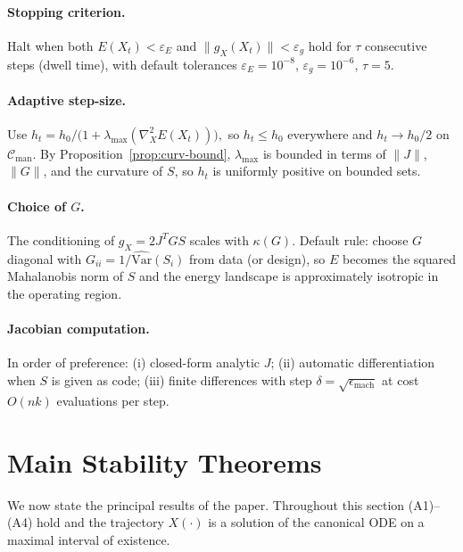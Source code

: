 \documentclass[11pt,oneside]{amsart}
\theoremstyle{plain}
\theoremstyle{definition}
\newcommand{\gX}{g_X}
\newcommand{\Cman}{\mathcal{C}_{\mathrm{man}}}
\begin{document}
\paragraph{Stopping criterion.} Halt when both
\(
  E(X_{t}) < \varepsilon_{E}
\)
and
\(
  \|\gX(X_{t})\| < \varepsilon_{g}
\)
hold for $\tau$ consecutive steps (dwell time), with default tolerances
$\varepsilon_{E} = 10^{-8}$, $\varepsilon_{g} = 10^{-6}$, $\tau = 5$.

\paragraph{Adaptive step-size.} Use
\(
  h_{t} = h_{0} / \bigl(1 + \lambda_{\max}(\nabla^{2}_{X}E(X_{t}))\bigr),
\)
so $h_{t}\le h_{0}$ everywhere and $h_{t}\to h_{0}/2$ on $\Cman$.
By Proposition~\ref{prop:curv-bound}, $\lambda_{\max}$ is bounded in
terms of $\|J\|$, $\|G\|$, and the curvature of $S$, so $h_{t}$ is
uniformly positive on bounded sets.

\paragraph{Choice of $G$.} The conditioning of $\gX = 2J^{T}GS$
scales with $\kappa(G)$. Default rule: choose $G$ diagonal with
$G_{ii} = 1/\widehat{\mathrm{Var}}(S_{i})$ from data (or design),
so $E$ becomes the squared Mahalanobis norm of $S$ and the energy
landscape is approximately isotropic in the operating region.

\paragraph{Jacobian computation.} In order of preference:
(i) closed-form analytic $J$;
(ii) automatic differentiation when $S$ is given as code;
(iii) finite differences with step $\delta = \sqrt{\epsilon_{\text{mach}}}$
at cost $O(nk)$ evaluations per step.

\section{Main Stability Theorems}
\label{sec:main-theorem}

We now state the principal results of the paper. Throughout this
section (A1)--(A4) hold and the trajectory $X(\cdot)$ is a solution
of the canonical ODE on a maximal interval of existence.
\end{document}
